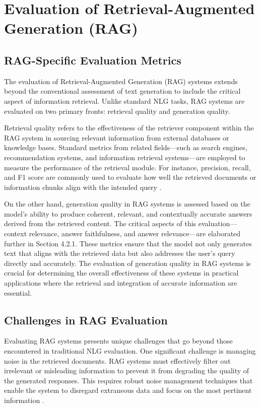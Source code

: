 \section{Evaluation of Retrieval-Augmented Generation (RAG)}

\subsection{RAG-Specific Evaluation Metrics}

The evaluation of Retrieval-Augmented Generation (RAG) systems extends beyond the conventional assessment of text generation to include the critical aspect of information retrieval. Unlike standard NLG tasks, RAG systems are evaluated on two primary fronts: retrieval quality and generation quality. 

Retrieval quality refers to the effectiveness of the retriever component within the RAG system in sourcing relevant information from external databases or knowledge bases. Standard metrics from related fields—such as search engines, recommendation systems, and information retrieval systems—are employed to measure the performance of the retrieval module. For instance, precision, recall, and F1 score are commonly used to evaluate how well the retrieved documents or information chunks align with the intended query \cite{gao2023retrieval}.

On the other hand, generation quality in RAG systems is assessed based on the model’s ability to produce coherent, relevant, and contextually accurate answers derived from the retrieved content. The critical aspects of this evaluation—context relevance, answer faithfulness, and answer relevance—are elaborated further in Section 4.2.1. These metrics ensure that the model not only generates text that aligns with the retrieved data but also addresses the user’s query directly and accurately. The evaluation of generation quality in RAG systems is crucial for determining the overall effectiveness of these systems in practical applications where the retrieval and integration of accurate information are essential.

\subsection{Challenges in RAG Evaluation}

Evaluating RAG systems presents unique challenges that go beyond those encountered in traditional NLG evaluation. One significant challenge is managing noise in the retrieved documents. RAG systems must effectively filter out irrelevant or misleading information to prevent it from degrading the quality of the generated responses. This requires robust noise management techniques that enable the system to disregard extraneous data and focus on the most pertinent information \cite{gao2023retrieval}.


